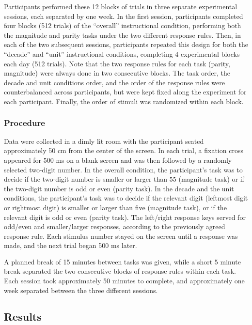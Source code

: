 \documentclass[english,man]{apa6}
\theoremstyle{definition}
\theoremstyle{definition}
\theoremstyle{definition}
\theoremstyle{remark}
\begin{document}
Participants performed these 12 blocks of trials in three separate
experimental sessions, each separated by one week. In the first session,
participants completed four blocks (512 trials) of the \enquote{overall}
instructional condition, performing both the magnitude and parity tasks
under the two different response rules. Then, in each of the two
subsequent sessions, participants repeated this design for both the
\enquote{decade} and \enquote{unit} instructional conditions, completing
4 experimental blocks each day (512 trials). Note that the two response
rules for each task (parity, magnitude) were always done in two
consecutive blocks. The task order, the decade and unit conditions
order, and the order of the response rules were counterbalanced across
participants, but were kept fixed along the experiment for each
participant. Finally, the order of stimuli was randomized within each
block.

\subsubsection{Procedure}\label{procedure}

Data were collected in a dimly lit room with the participant seated
approximately 50 cm from the center of the screen. In each trial, a
fixation cross appeared for 500 ms on a blank screen and was then
followed by a randomly selected two-digit number. In the overall
condition, the participant's task was to decide if the two-digit number
is smaller or larger than 55 (magnitude task) or if the two-digit number
is odd or even (parity task). In the decade and the unit conditions, the
participant's task was to decide if the relevant digit (leftmost digit
or rightmost digit) is smaller or larger than five (magnitude task), or
if the relevant digit is odd or even (parity task). The left/right
response keys served for odd/even and smaller/larger responses,
according to the previously agreed response rule. Each stimulus number
stayed on the screen until a response was made, and the next trial began
500 ms later.

A planned break of 15 minutes between tasks was given, while a short 5
minute break separated the two consecutive blocks of response rules
within each task. Each session took approximately 50 minutes to
complete, and approximately one week separated between the three
different sessions.

\subsection{Results}\label{results}
\end{document}
